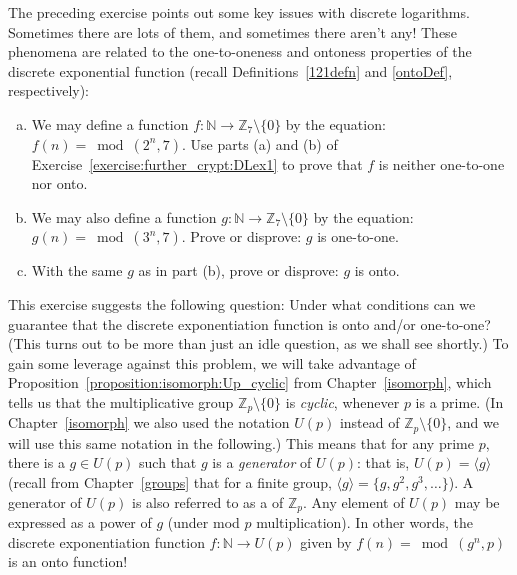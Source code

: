The preceding exercise points out some key issues with discrete logarithms. Sometimes there are lots of them, and sometimes there aren't any! These phenomena are related to the one-to-oneness and ontoness properties of  the discrete exponential function (recall Definitions~\ref{121defn} and \ref{ontoDef}, respectively):

\begin{exercise}\label{exercise:further_crypt:DLex2}
\begin{enumerate}[(a)]
\item
We may define a function $f: \mathbb{N} \rightarrow \mathbb{Z}_7 \setminus \{0\}$ by the equation: $f(n) = \bmod(2^n,7)$. 
Use parts (a) and (b) of Exercise~\ref{exercise:further_crypt:DLex1} to prove that $f$ is neither one-to-one nor onto.
\item
We may also define a function $g: \mathbb{N} \rightarrow \mathbb{Z}_7 \setminus \{0\}$ by the equation: $g(n) = \bmod(3^n,7)$. 
Prove or disprove: $g$ is one-to-one.
\item
With the same $g$ as in part (b), prove or disprove: $g$ is onto.
\end{enumerate}
\end{exercise}

This exercise suggests the following question:  Under what conditions can we guarantee that the discrete exponentiation function is onto and/or one-to-one? (This turns out to be more than just an idle question, as we shall see shortly.)  To gain some leverage against this problem, we will take advantage of   Proposition~\ref{proposition:isomorph:Up_cyclic} from Chapter~\ref{isomorph}, which tells us that the multiplicative group $\mathbb{Z}_p\setminus \{0\}$ is \emph{cyclic}, whenever $p$ is a prime. (In Chapter~\ref{isomorph} we also used the notation $U(p)$ instead of $\mathbb{Z}_p\setminus \{0\}$, and we will use this same notation in the following.) This means that for any prime $p$, there is a $g \in U(p)$  such that $g$ is a \emph{generator} of  $U(p)$: that is, $U(p) = \langle g \rangle$ (recall from Chapter~\ref{groups} that for a finite group, $\langle g \rangle = \{g, g^2, g^3, \ldots \}$). A generator of $U(p)$ is also referred to as a  of $\mathbb{Z}_p$. Any element of $U(p)$ may be expressed as a power of $g$ (under mod $p$ multiplication).  In other words, the discrete exponentiation function $f: \mathbb{N} \rightarrow U(p)$ given by $f(n) = \bmod(g^n,p)$ is an onto function!  


